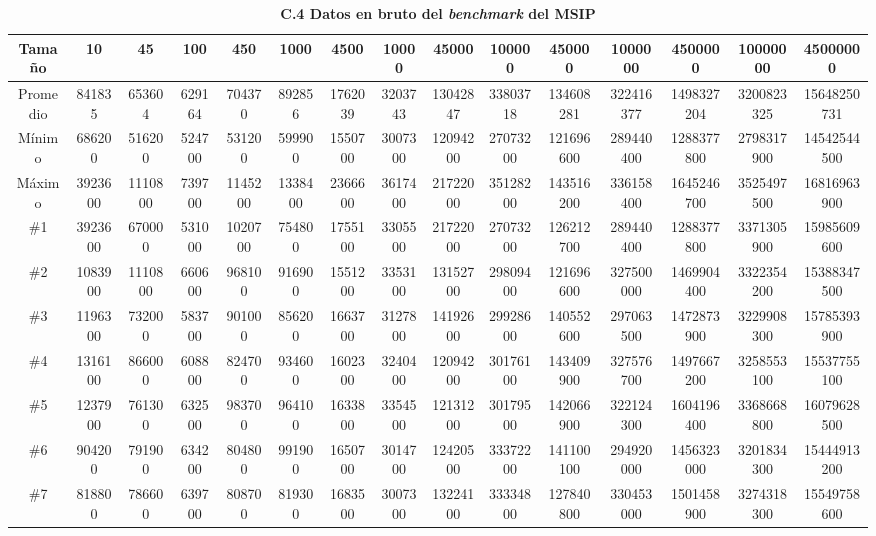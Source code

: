 \documentclass[titlepage]{article}
\begin{document}
\begin{landscape}	
	\begin{table}[h]
		\centering
		\smaller
		\caption*{\textbf{C.4 Datos en bruto del \textit{benchmark} del MSIP}}
		\begin{tabular}{|c|c|c|c|c|c|c|c|c|c|c|c|c|c|c|} 
			\hline
			Tamaño   & 10      & 45      & 100    & 450     & 1000    & 4500    & 10000   & 45000    & 100000   & 450000    & 1000000   & 4500000    & 10000000   & 45000000     \\ 
			\hline
			Promedio & 841835  & 653604  & 629164 & 704370  & 892856  & 1762039 & 3203743 & 13042847 & 33803718 & 134608281 & 322416377 & 1498327204 & 3200823325 & 15648250731  \\ 
			\hline
			Mínimo   & 686200  & 516200  & 524700 & 531200  & 599900  & 1550700 & 3007300 & 12094200 & 27073200 & 121696600 & 289440400 & 1288377800 & 2798317900 & 14542544500  \\ 
			\hline
			Máximo   & 3923600 & 1110800 & 739700 & 1145200 & 1338400 & 2366600 & 3617400 & 21722000 & 35128200 & 143516200 & 336158400 & 1645246700 & 3525497500 & 16816963900  \\ 
			\hline
			\#1      & 3923600 & 670000  & 531000 & 1020700 & 754800  & 1755100 & 3305500 & 21722000 & 27073200 & 126212700 & 289440400 & 1288377800 & 3371305900 & 15985609600  \\ 
			\hline
			\#2      & 1083900 & 1110800 & 660600 & 968100  & 916900  & 1551200 & 3353100 & 13152700 & 29809400 & 121696600 & 327500000 & 1469904400 & 3322354200 & 15388347500  \\ 
			\hline
			\#3      & 1196300 & 732000  & 583700 & 901000  & 856200  & 1663700 & 3127800 & 14192600 & 29928600 & 140552600 & 297063500 & 1472873900 & 3229908300 & 15785393900  \\ 
			\hline
			\#4      & 1316100 & 866000  & 608800 & 824700  & 934600  & 1602300 & 3240400 & 12094200 & 30176100 & 143409900 & 327576700 & 1497667200 & 3258553100 & 15537755100  \\ 
			\hline
			\#5      & 1237900 & 761300  & 632500 & 983700  & 964100  & 1633800 & 3354500 & 12131200 & 30179500 & 142066900 & 322124300 & 1604196400 & 3368668800 & 16079628500  \\ 
			\hline
			\#6      & 904200  & 791900  & 634200 & 804800  & 991900  & 1650700 & 3014700 & 12420500 & 33372200 & 141100100 & 294920000 & 1456323000 & 3201834300 & 15444913200  \\ 
			\hline
			\#7      & 818800  & 786600  & 639700 & 808700  & 819300  & 1683500 & 3007300 & 13224100 & 33334800 & 127840800 & 330453000 & 1501458900 & 3274318300 & 15549758600  \\ 

\end{tabular}
\end{table}
\end{landscape}
\end{document}
